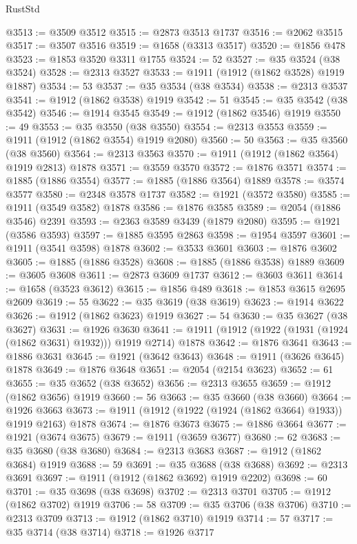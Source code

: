 \begin{lexlean}{RustStd}
\begin{coremodule}
@3513 := @3509 @3512
@3515 := @2873 @3513 @1737
@3516 := @2062 @3515
@3517 := @3507 @3516
@3519 := @1658 (@3313 @3517)
@3520 := @1856 @478
@3523 := @1853 @3520 @3311 @1755
@3524 := 52
@3527 := @35 @3524 (@38 @3524)
@3528 := @2313 @3527
@3533 := @1911 (@1912 (@1862 @3528) @1919 @1887)
@3534 := 53
@3537 := @35 @3534 (@38 @3534)
@3538 := @2313 @3537
@3541 := @1912 (@1862 @3538) @1919
@3542 := 51
@3545 := @35 @3542 (@38 @3542)
@3546 := @1914 @3545
@3549 := @1912 (@1862 @3546) @1919
@3550 := 49
@3553 := @35 @3550 (@38 @3550)
@3554 := @2313 @3553
@3559 := @1911 (@1912 (@1862 @3554) @1919 @2080)
@3560 := 50
@3563 := @35 @3560 (@38 @3560)
@3564 := @2313 @3563
@3570 := @1911 (@1912 (@1862 @3564) @1919 @2813) @1878
@3571 := @3559 @3570
@3572 := @1876 @3571
@3574 := @1885 (@1886 @3554)
@3577 := @1885 (@1886 @3564) @1889
@3578 := @3574 @3577
@3580 := @2348 @3578 @1737
@3582 := @1921 (@3572 @3580)
@3585 := @1911 (@3549 @3582) @1878
@3586 := @1876 @3585
@3589 := @2054 (@1886 @3546) @2391
@3593 := @2363 @3589 @3439 (@1879 @2080)
@3595 := @1921 (@3586 @3593)
@3597 := @1885 @3595 @2863
@3598 := @1954 @3597
@3601 := @1911 (@3541 @3598) @1878
@3602 := @3533 @3601
@3603 := @1876 @3602
@3605 := @1885 (@1886 @3528)
@3608 := @1885 (@1886 @3538) @1889
@3609 := @3605 @3608
@3611 := @2873 @3609 @1737
@3612 := @3603 @3611
@3614 := @1658 (@3523 @3612)
@3615 := @1856 @489
@3618 := @1853 @3615 @2695 @2609
@3619 := 55
@3622 := @35 @3619 (@38 @3619)
@3623 := @1914 @3622
@3626 := @1912 (@1862 @3623) @1919
@3627 := 54
@3630 := @35 @3627 (@38 @3627)
@3631 := @1926 @3630
@3641 := @1911 (@1912 (@1922 (@1931 (@1924 (@1862 @3631) @1932))) @1919 @2714) @1878
@3642 := @1876 @3641
@3643 := @1886 @3631
@3645 := @1921 (@3642 @3643)
@3648 := @1911 (@3626 @3645) @1878
@3649 := @1876 @3648
@3651 := @2054 (@2154 @3623)
@3652 := 61
@3655 := @35 @3652 (@38 @3652)
@3656 := @2313 @3655
@3659 := @1912 (@1862 @3656) @1919
@3660 := 56
@3663 := @35 @3660 (@38 @3660)
@3664 := @1926 @3663
@3673 := @1911 (@1912 (@1922 (@1924 (@1862 @3664) @1933)) @1919 @2163) @1878
@3674 := @1876 @3673
@3675 := @1886 @3664
@3677 := @1921 (@3674 @3675)
@3679 := @1911 (@3659 @3677)
@3680 := 62
@3683 := @35 @3680 (@38 @3680)
@3684 := @2313 @3683
@3687 := @1912 (@1862 @3684) @1919
@3688 := 59
@3691 := @35 @3688 (@38 @3688)
@3692 := @2313 @3691
@3697 := @1911 (@1912 (@1862 @3692) @1919 @2202)
@3698 := 60
@3701 := @35 @3698 (@38 @3698)
@3702 := @2313 @3701
@3705 := @1912 (@1862 @3702) @1919
@3706 := 58
@3709 := @35 @3706 (@38 @3706)
@3710 := @2313 @3709
@3713 := @1912 (@1862 @3710) @1919
@3714 := 57
@3717 := @35 @3714 (@38 @3714)
@3718 := @1926 @3717

\end{coremodule}
\end{lexlean}
